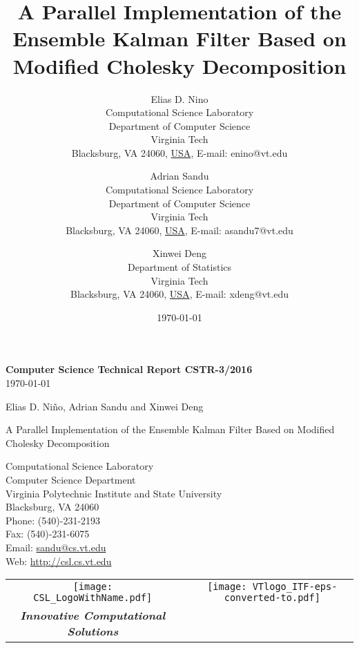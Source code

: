 \documentclass[12pt]{article}
\title{A Parallel Implementation of the Ensemble Kalman Filter Based on Modified
Cholesky Decomposition}
\author{
        Elias D. Nino \\
        Computational Science Laboratory\\
        Department of Computer Science\\
        Virginia Tech \\
        Blacksburg, VA 24060, \underline{USA}, E-mail: {enino@vt.edu}
            \and
        Adrian Sandu \\
        Computational Science Laboratory\\
        Department of Computer Science\\
        Virginia Tech \\
        Blacksburg, VA 24060, \underline{USA}, E-mail: {asandu7@vt.edu}
         \and
        Xinwei Deng \\
        Department of Statistics \\
        Virginia Tech \\
        Blacksburg, VA 24060, \underline{USA}, E-mail: {xdeng@vt.edu}
}
\date{\today}
\begin{document}
\thispagestyle{empty}
\setcounter{page}{0}

\begin{Huge}
\begin{center}
{\bf Computer Science Technical Report CSTR-3/2016 }\\
\today
\end{center}
\end{Huge}
\vfil
\begin{huge}
\begin{center}
Elias D. Ni\~no, Adrian Sandu and Xinwei Deng
\end{center}
\end{huge}

\vfil
\begin{huge}
\begin{it}
\begin{center}
A Parallel Implementation of the Ensemble Kalman Filter Based on Modified
Cholesky Decomposition
\end{center}
\end{it}
\end{huge}
\vfil


\begin{large}
\begin{center}
Computational Science Laboratory \\
Computer Science Department \\
Virginia Polytechnic Institute and State University \\
Blacksburg, VA 24060 \\
Phone: (540)-231-2193 \\
Fax: (540)-231-6075 \\ 
Email: \url{sandu@cs.vt.edu} \\
Web: \url{http://csl.cs.vt.edu}
\end{center}
\end{large}

\vspace*{1cm}


\begin{tabular}{ccc}
\texttt{[image: CSL\_LogoWithName.pdf]}
&\hspace{2.5in}&
\texttt{[image: VTlogo\_ITF-eps-converted-to.pdf]} \\
{\bf\em Innovative Computational Solutions} &&\\
\end{tabular}

\newpage
 
\maketitle
\end{document}
